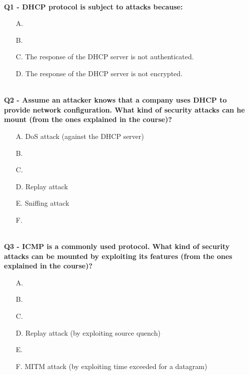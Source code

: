 \textbf{\\Q1 - DHCP protocol is subject to attacks because:}
\begin{itemize}
    \item[A.] 
    \item[B.] 
    \item[C.] The response of the DHCP server is not authenticated.
    \item[D.] The response of the DHCP server is not encrypted.
\end{itemize}

\textbf{\\Q2 - Assume an attacker knows that a company uses DHCP to provide network configuration. What kind of security attacks can he mount (from the ones explained in the course)?}
\begin{itemize}
    \item[A.] DoS attack (against the DHCP server)
    \item[B.] 
    \item[C.] 
    \item[D.] Replay attack
    \item[E.] Sniffing attack
    \item[F.] 
\end{itemize}


\textbf{\\Q3 - ICMP is a commonly used protocol. What kind of security attacks can be mounted by exploiting its features (from the ones explained in the course)?}
\begin{itemize}
    \item[A.] 
    \item[B.] 
    \item[C.] 
    \item[D.] Replay attack (by exploiting source quench)
    \item[E.] 
    \item[F.] MITM attack (by exploiting time exceeded for a datagram)
\end{itemize}

